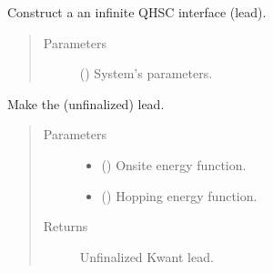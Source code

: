 \documentclass[letterpaper,10pt,english]{sphinxmanual}
\begin{document}
\begin{fulllineitems}
\label{\detokenize{modules:modules.system.DeviceInfinite}}
\pysigstartsignatures
{}
\pysigstopsignatures
\sphinxAtStartPar
Construct a an infinite QH\sphinxhyphen{}SC interface (lead).
\begin{quote}\begin{description}
\item[{Parameters}] \leavevmode
\sphinxAtStartPar
{} () \textendash{} System’s parameters.

\end{description}\end{quote}

\begin{fulllineitems}
\label{\detokenize{modules:modules.system.DeviceInfinite.make_system}}
\pysigstartsignatures
{}
\pysigstopsignatures
\sphinxAtStartPar
Make the (unfinalized) lead.
\begin{quote}\begin{description}
\item[{Parameters}] \leavevmode\begin{itemize}
\item {} 
\sphinxAtStartPar
{} () \textendash{} Onsite energy function.

\item {} 
\sphinxAtStartPar
{} () \textendash{} Hopping energy function.

\end{itemize}

\item[{Returns}] \leavevmode
\sphinxAtStartPar
Unfinalized Kwant lead.

\end{description}\end{quote}

\end{fulllineitems}


\end{fulllineitems}
\end{document}
